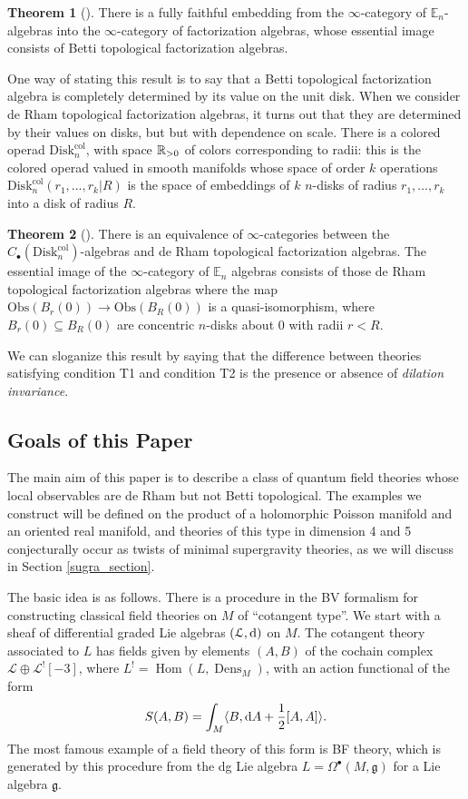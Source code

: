 \documentclass[11pt, oneside, reqno]{amsart}
\theoremstyle{definition} \newtheorem{definition}{Definition}[section]
\newtheorem{theorem}[definition]{Theorem}
\theoremstyle{definition}
\theoremstyle{remark}
\theoremstyle{definition} \newtheorem{remark}[definition]{Remark}
\theoremstyle{definition} \newtheorem{remarks}[definition]{Remarks}
\theoremstyle{definition} \newtheorem{question}[definition]{Question}
\theoremstyle{definition} \newtheorem*{note}{Note}
\theoremstyle{definition} \newtheorem{example}[definition]{Example}
\theoremstyle{definition} \newtheorem{examples}[definition]{Examples}
\renewcommand{\gg}{\mathfrak{g}}
\newcommand{\sub}{\subseteq}
\newcommand{\bb}[1]{\mathbb{#1}}
\newcommand{\mr}[1]{\mathrm{#1}}
\newcommand{\mc}[1]{\mathcal{#1}}
\renewcommand{\hom}{\operatorname{Hom}}
\DeclareMathOperator{\dens}{Dens}
\def\d{{\rm d}}
\newcommand{\obs}{\mathrm{Obs}}
\begin{document}
\begin{theorem}[{\cite[Theorem 5.4.5.9]{HA}}]
There is a fully faithful embedding from the $\infty$-category of $\bb E_n$-algebras into the $\infty$-category of factorization algebras, whose essential image consists of Betti topological factorization algebras.
\end{theorem}

One way of stating this result is to say that a Betti topological factorization algebra is completely determined by its value on the unit disk.  When we consider de Rham topological factorization algebras, it turns out that they are determined by their values on disks, but but with dependence on scale.  There is a colored operad $\mr{Disk}_n^{\mr{col}}$, with space $\mathbb R_{>0}$ of colors corresponding to radii: this is the colored operad valued in smooth manifolds whose space of order $k$ operations $\mr{Disk}_n^{\mr{col}}(r_1, \ldots, r_k | R)$ is the space of embeddings of $k$ $n$-disks of radius $r_1, \ldots, r_k$ into a disk of radius $R$.

\begin{theorem}[{\cite[Theorem 2.23 and 2.29]{ElliottSafronov}}]
There is an equivalence of $\infty$-categories between the $C_\bullet(\mr{Disk}_n^{\mr{col}})$-algebras and de Rham topological factorization algebras.  The essential image of the $\infty$-category of $\bb E_n$ algebras consists of those de Rham topological factorization algebras where the map $\obs(B_r(0)) \to \obs(B_R(0))$ is a quasi-isomorphism, where $B_r(0) \sub B_R(0)$ are concentric $n$-disks about 0 with radii $r < R$.
\end{theorem}

We can sloganize this result by saying that the difference between theories satisfying condition T1 and condition T2 is the presence or absence of \emph{dilation invariance}.

\subsection{Goals of this Paper}
The main aim of this paper is to describe a class of quantum field theories whose local observables are de Rham but not Betti topological.  The examples we construct will be defined on the product of a holomorphic Poisson manifold and an oriented real manifold, and theories of this type in dimension 4 and 5 conjecturally occur as twists of minimal supergravity theories, as we will discuss in Section \ref{sugra_section}.

The basic idea is as follows.  There is a procedure in the BV formalism for constructing classical field theories on $M$ of ``cotangent type''.  We start with a sheaf of differential graded Lie algebras $(\mc L, \d)$ on $M$.  The cotangent theory associated to $L$ has fields given by elements $(A,B)$ of the cochain complex $\mc L \oplus \mc L^![-3]$, where $L^! = \hom(L, \dens_M)$, with an action functional of the form
\[S(A,B) = \int_M \langle B, \d A + \frac 12 [A,A] \rangle.\]
The most famous example of a field theory of this form is BF theory, which is generated by this procedure from the dg Lie algebra $L = \Omega^\bullet(M, \gg)$ for a Lie algebra $\gg$.
\end{document}
